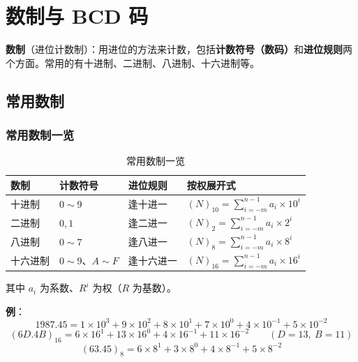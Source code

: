 \chapter{数制与 BCD 码}
\label{chap:数制与BCD码}

\textbf{数制}（进位计数制）：用进位的方法来计数，包括\textbf{计数符号（数码）}和\textbf{进位规则}两个方面。常用的有十进制、二进制、八进制、十六进制等。

\section{常用数制}
\label{sec:常用数制}

\subsection{常用数制一览}
\label{sec:常用数制一览}

\begin{table}[H]
\centering
\caption{常用数制一览}
\label{tab:数制:常用数制}
\begin{tabular}{llll}
	\toprule
	数制 & 计数符号 & 进位规则 & 按权展开式 \\
	\midrule
	十进制 & $0\sim9$ & 逢十进一 & $(N)_{10}=\sum\limits_{i=-m}^{n-1}a_i\times10^{i}$ \\
	二进制 & $0,1$ & 逢二进一 & $(N)_{2}=\sum\limits_{i=-m}^{n-1}a_i\times2^{i}$ \\
	八进制 & $0\sim7$ & 逢八进一 & $(N)_{8}=\sum\limits_{i=-m}^{n-1}a_i\times8^{i}$ \\
	十六进制 & $0\sim9$、$A\sim F$ & 逢十六进一 & $(N)_{16}=\sum\limits_{i=-m}^{n-1}a_i\times16^{i}$ \\
	\bottomrule
\end{tabular}
\end{table}

其中 $a_i$ 为系数、$R^{i}$ 为权（$R$ 为基数）。

\textbf{例}：
\begin{equation}
	1987.45=1\times10^{3}+9\times10^{2}+8\times10^{1}+7\times10^{0}
	+4\times10^{-1}+5\times10^{-2}
	\label{eq:数制:十进制展开例}
\end{equation}
\begin{equation}
	(6D.4B)_{16}=6\times16^{1}+13\times16^{0}+4\times16^{-1}+11\times16^{-2}
	\qquad (D=13,\ B=11)
	\label{eq:数制:十六进制展开例}
\end{equation}
\begin{equation}
	(63.45)_{8}=6\times8^{1}+3\times8^{0}+4\times8^{-1}+5\times8^{-2}
	\label{eq:数制:八进制展开例}
\end{equation}

